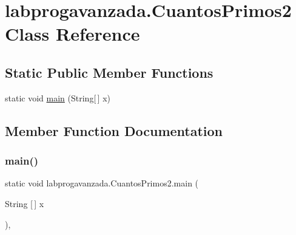 \hypertarget{classlabprogavanzada_1_1_cuantos_primos2}{}\section{labprogavanzada.\+Cuantos\+Primos2 Class Reference}
\label{classlabprogavanzada_1_1_cuantos_primos2}
\subsection*{Static Public Member Functions}
\begin{DoxyCompactItemize}
\item 
static void \mbox{\hyperlink{classlabprogavanzada_1_1_cuantos_primos2_a547831267d85ce0beb2e98881644a671}{main}} (String\mbox{[}$\,$\mbox{]} x)
\end{DoxyCompactItemize}


\subsection{Member Function Documentation}
\mbox{\label{classlabprogavanzada_1_1_cuantos_primos2_a547831267d85ce0beb2e98881644a671}} 
\subsubsection{\texorpdfstring{main()}{main()}}
{\footnotesize\ttfamily static void labprogavanzada.\+Cuantos\+Primos2.\+main (\begin{DoxyParamCaption}\item[{String \mbox{[}$\,$\mbox{]}}]{x }\end{DoxyParamCaption})\hspace{0.3cm}{\ttfamily [inline]}, {\ttfamily [static]}}



